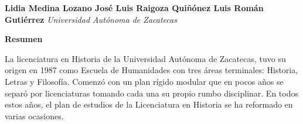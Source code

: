 
\thispagestyle{empty}
{\par}
\setcounter{footnote}{0}

\bigskip
\begin{center}
{\bfseries Lidia Medina Lozano\newline
José Luis Raigoza Quiñónez\newline
Luis Román Gutiérrez}\newline
{\itshape Universidad Autónoma de Zacatecas}
\end{center}

\bigskip
\textbf{Resumen}

La licenciatura en Historia de la Universidad Autónoma de Zacatecas, 
tuvo su origen en 1987 como Escuela de Humanidades con tres áreas 
terminales: Historia, Letras y Filosofía. Comenzó con un plan rígido 
modular que en pocos años se separó por licenciaturas tomando cada una 
su propio rumbo disciplinar. En todos estos años, el plan de estudios 
de la Licenciatura en Historia se ha reformado en varias ocasiones.


